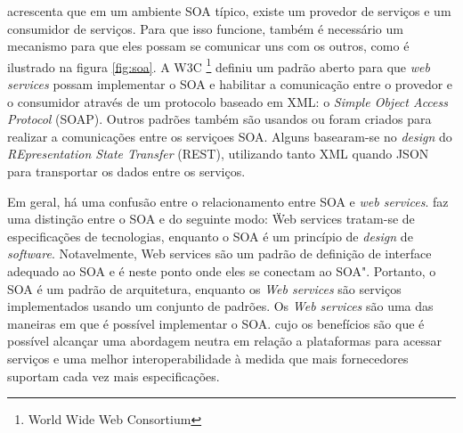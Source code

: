  acrescenta que em um ambiente SOA típico, existe um provedor de serviços e um consumidor de serviços. Para que isso funcione, também é necessário um mecanismo para que eles possam se comunicar uns com os outros, como é ilustrado na figura \ref{fig:soa}. A W3C \footnote{World Wide Web Consortium} definiu um padrão aberto para que \textit{web services} possam implementar o SOA e habilitar a comunicação entre o provedor e o consumidor através de um protocolo baseado em XML: o \textit{Simple Object Access Protocol} (SOAP). Outros padrões também são usandos ou foram criados para realizar a comunicações entre os serviçoes SOA. Alguns basearam-se no \textit{design} do \textit{REpresentation State Transfer} (REST), utilizando tanto XML quando JSON para transportar os dados entre os serviços.

Em geral, há uma confusão entre o relacionamento entre SOA e \textit{web services}.  faz uma distinção entre o SOA e  do seguinte modo: \"Web services tratam-se de especificações de tecnologias, enquanto o SOA é um princípio de \textit{design} de \textit{software}. Notavelmente, Web services são um padrão de definição de interface adequado ao SOA e é neste ponto onde eles se conectam ao SOA". Portanto, o SOA é um padrão de arquitetura, enquanto os \textit{Web services} são serviços implementados usando um conjunto de padrões. Os \textit{Web services} são uma das maneiras em que é possível implementar o SOA. cujo os benefícios são que é possível alcançar uma abordagem neutra em relação a plataformas para acessar serviços e uma melhor interoperabilidade à medida que mais fornecedores suportam cada vez mais especificações.
